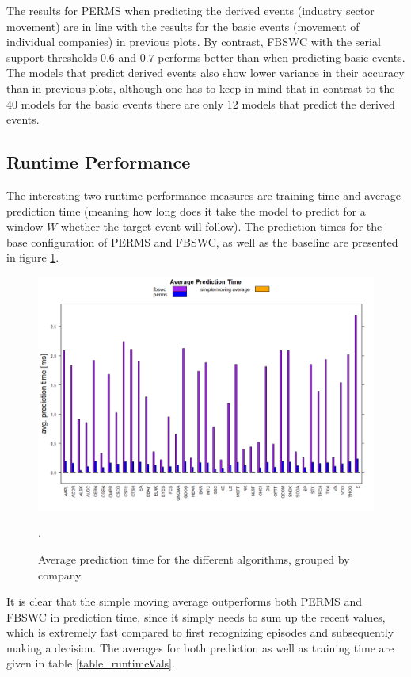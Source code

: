 The results for PERMS when predicting the derived events (industry sector movement) are in line with the results for the basic events (movement of individual companies) in previous plots. By contrast, FBSWC with the serial support thresholds $0.6$ and $0.7$ performs better than when predicting basic events. The models that predict derived events also show lower variance in their accuracy than in previous plots, although one has to keep in mind that in contrast to the 40 models for the basic events there are only 12 models that predict the derived events.

\subsection{Runtime Performance}
The interesting two runtime performance measures are training time and average prediction time (meaning how long does it take the model to predict for a window $W$ whether the target event will follow). The prediction times for the base configuration of PERMS and FBSWC, as well as the baseline are presented in figure \ref{fig_runtimeBaseConfig}.

\begin{figure}
	\centering
  	\includegraphics[width=\textwidth]{runtimeBaseConfig}
	\caption[Prediction Time Barchart]{Average prediction time for the different algorithms, grouped by company.}.
	\label{fig_runtimeBaseConfig}
\end{figure}

It is clear that the simple moving average outperforms both PERMS and FBSWC in prediction time, since it simply needs to sum up the recent values, which is extremely fast compared to first recognizing episodes and subsequently making a decision. The averages for both prediction as well as training time are given in table \ref{table_runtimeVals}. 

